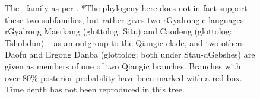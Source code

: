 \begin{figure}
  \centering
  
  \caption{The \lfam\ family as per . *The phylogeny here does not in fact support these two subfamilies, but rather gives two rGyalrongic languages -- rGyalrong Maerkang (glottolog: Situ) and Caodeng (glottolog: Tshobdun) -- as an outgroup to the Qiangic clade, and two others -- Daofu and Ergong Danba (glottolog: both under Stau-dGebshes) are given as members of one of two Qiangic branches. Branches with over 80\% posterior probability have been marked with a red box. Time depth has not been reproduced in this tree.}\label{f:Methods:Zhang2019}
  \end{figure}

